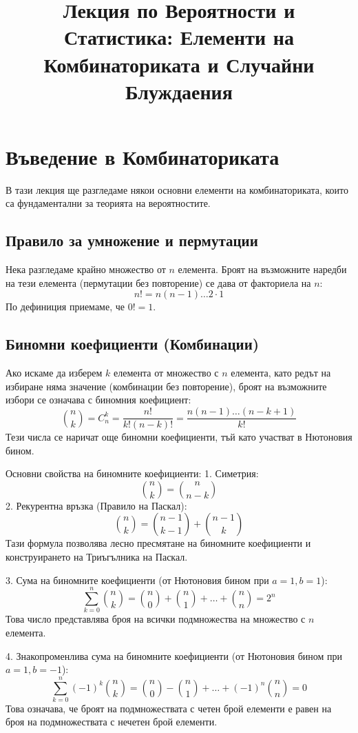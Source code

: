 \documentclass[12pt]{article}
\title{Лекция по Вероятности и Статистика: Елементи на Комбинаториката и Случайни Блуждаения}
\author{}
\date{}
\begin{document}
\maketitle

\section{Въведение в Комбинаториката}
В тази лекция ще разгледаме някои основни елементи на комбинаториката, които са фундаментални за теорията на вероятностите. 

\subsection{Правило за умножение и пермутации}
Нека разгледаме крайно множество от $n$ елемента. Броят на възможните наредби на тези елемента (пермутации без повторение) се дава от факториела на $n$:
\[ n! = n(n-1) \dots 2 \cdot 1 \]
По дефиниция приемаме, че $0! = 1$.

\subsection{Биномни коефициенти (Комбинации)}
Ако искаме да изберем $k$ елемента от множество с $n$ елемента, като редът на избиране няма значение (комбинации без повторение), броят на възможните избори се означава с биномния коефициент:
\[ \binom{n}{k} = C_n^k = \frac{n!}{k!(n-k)!} = \frac{n(n-1)\dots(n-k+1)}{k!} \]
Тези числа се наричат още биномни коефициенти, тъй като участват в Нютоновия бином.

Основни свойства на биномните коефициенти:
1. Симетрия:
\[ \binom{n}{k} = \binom{n}{n-k} \]
2. Рекурентна връзка (Правило на Паскал):
\[ \binom{n}{k} = \binom{n-1}{k-1} + \binom{n-1}{k} \]
Тази формула позволява лесно пресмятане на биномните коефициенти и конструирането на Триъгълника на Паскал.

3. Сума на биномните коефициенти (от Нютоновия бином при $a=1, b=1$):
\[ \sum_{k=0}^{n} \binom{n}{k} = \binom{n}{0} + \binom{n}{1} + \dots + \binom{n}{n} = 2^n \]
Това число представлява броя на всички подмножества на множество с $n$ елемента.

4. Знакопроменлива сума на биномните коефициенти (от Нютоновия бином при $a=1, b=-1$):
\[ \sum_{k=0}^{n} (-1)^k \binom{n}{k} = \binom{n}{0} - \binom{n}{1} + \dots + (-1)^n \binom{n}{n} = 0 \]
Това означава, че броят на подмножествата с четен брой елементи е равен на броя на подмножествата с нечетен брой елементи.
\end{document}
